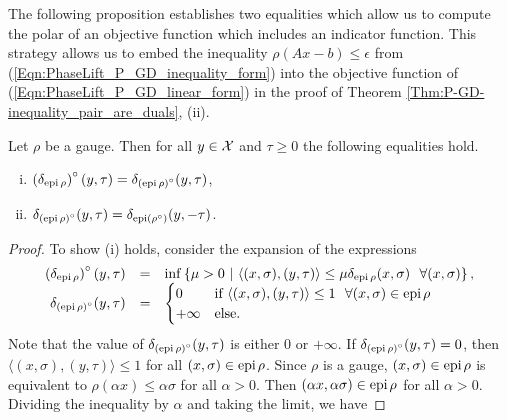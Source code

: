 \begin{enumerate}
The following proposition establishes two equalities which allow us to compute the polar of an objective function which includes an indicator function.  This strategy allows us to embed the inequality $\rho(Ax-b) \leq \epsilon$ from (\ref{Eqn:PhaseLift_P_GD_inequality_form}) into the objective function of (\ref{Eqn:PhaseLift_P_GD_linear_form}) in the proof of Theorem \ref{Thm:P-GD-inequality_pair_are_duals}, (ii).


\begin{prop}				\label{Prop:P-GD-indicator_epigraph_polar}
Let $\rho$ be a gauge.  Then for all $y \in {\mathcal X}$ and $\tau \geq 0$ the following equalities hold.
\begin{enumerate}[(i)]
\item
 $\left( \delta_{\textnormal{epi} \hspace{0.05cm} \rho} \right)^\circ(y, \tau) = \delta_{\left(  \textnormal{epi} \hspace{0.05cm} \rho \right)^\circ} (y, \tau)$,
\item
$\delta_{\left( \textnormal{epi} \hspace{0.05cm} \rho \right)^\circ} (y, \tau) = \delta_{\textnormal{epi} \left( \rho^\circ \right)}(y, -\tau)$.
\end{enumerate}
\end{prop}
\begin{proof}
To show (i) holds, consider the expansion of the expressions
\begin{equation*}
\begin{array}{rll}
\left( \delta_{\textnormal{epi} \halfspace \rho} \right)^\circ(y, \tau) 
	&	= 
			&	 \inf \left\{ \mu > 0 \ | \ \langle (x, \sigma), (y, \tau) \rangle \leq \mu \delta_{\epi \halfspace \rho}(x, \sigma) \ \ \forall (x, \sigma) \right\},
					\\
\delta_{\left( \epi \halfspace \rho \right)^\circ} (y, \tau) 
	&	= 
			&	\begin{cases}
						0 	&\textnormal{if } \langle (x, \sigma) , (y, \tau) \rangle \leq 1 \ \ \forall (x, \sigma) \in \epi \halfspace \rho \\
						+\infty	&\textnormal{else}.
				\end{cases}	
\end{array}
\end{equation*}
Note that the value of $\delta_{\left(  \textnormal{epi} \hspace{0.05cm} \rho \right)^\circ} (y, \tau)$ is either $0$ or $+\infty$.  If $\delta_{\left(  \textnormal{epi} \hspace{0.05cm} \rho \right)^\circ} (y, \tau) = 0$, then $\langle (x, \sigma), (y, \tau) \rangle  \leq 1$ for all $(x, \sigma) \in \textnormal{epi} \hspace{0.05cm} \rho$.  Since $\rho$ is a gauge, $(x, \sigma) \in \textnormal{epi} \hspace{0.05cm} \rho$ is equivalent to $\rho(\alpha x) \leq \alpha \sigma$ for all $\alpha > 0$.  Then $(\alpha x, \alpha \sigma) \in \textnormal{epi} \hspace{0.05cm} \rho$ for all $\alpha > 0$.  Dividing the inequality by $\alpha$ and taking the limit, we have

\end{proof}
\end{enumerate}
